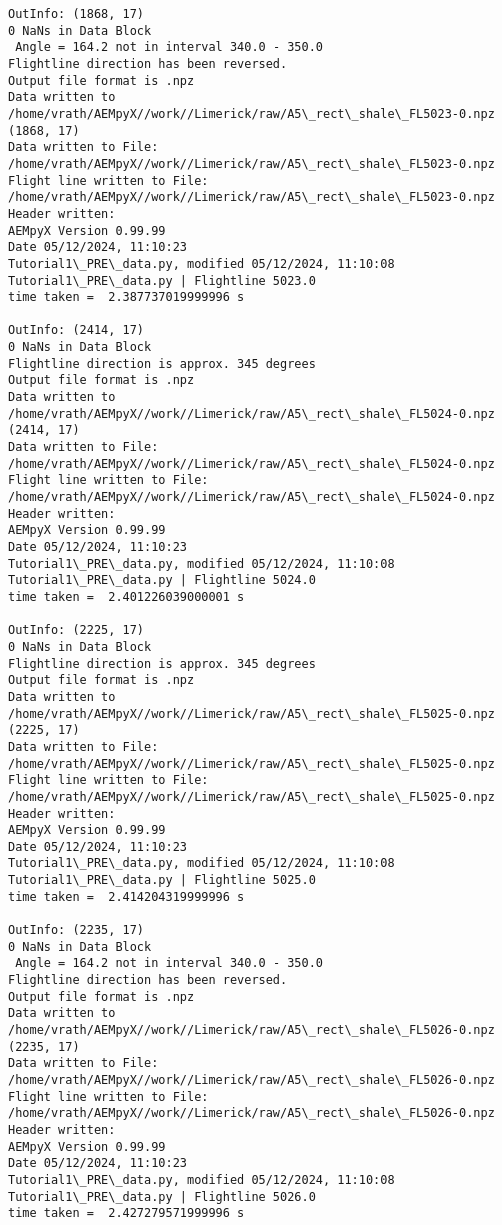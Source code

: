 \documentclass[11pt]{article}
\begin{document}
\begin{Verbatim}[commandchars=\\\{\}]
OutInfo: (1868, 17)
0 NaNs in Data Block
 Angle = 164.2 not in interval 340.0 - 350.0
Flightline direction has been reversed.
Output file format is .npz
Data written to
/home/vrath/AEMpyX//work//Limerick/raw/A5\_rect\_shale\_FL5023-0.npz
(1868, 17)
Data written to File:
/home/vrath/AEMpyX//work//Limerick/raw/A5\_rect\_shale\_FL5023-0.npz
Flight line written to File:
/home/vrath/AEMpyX//work//Limerick/raw/A5\_rect\_shale\_FL5023-0.npz
Header written:
AEMpyX Version 0.99.99
Date 05/12/2024, 11:10:23
Tutorial1\_PRE\_data.py, modified 05/12/2024, 11:10:08
Tutorial1\_PRE\_data.py | Flightline 5023.0
time taken =  2.387737019999996 s

OutInfo: (2414, 17)
0 NaNs in Data Block
Flightline direction is approx. 345 degrees
Output file format is .npz
Data written to
/home/vrath/AEMpyX//work//Limerick/raw/A5\_rect\_shale\_FL5024-0.npz
(2414, 17)
Data written to File:
/home/vrath/AEMpyX//work//Limerick/raw/A5\_rect\_shale\_FL5024-0.npz
Flight line written to File:
/home/vrath/AEMpyX//work//Limerick/raw/A5\_rect\_shale\_FL5024-0.npz
Header written:
AEMpyX Version 0.99.99
Date 05/12/2024, 11:10:23
Tutorial1\_PRE\_data.py, modified 05/12/2024, 11:10:08
Tutorial1\_PRE\_data.py | Flightline 5024.0
time taken =  2.401226039000001 s

OutInfo: (2225, 17)
0 NaNs in Data Block
Flightline direction is approx. 345 degrees
Output file format is .npz
Data written to
/home/vrath/AEMpyX//work//Limerick/raw/A5\_rect\_shale\_FL5025-0.npz
(2225, 17)
Data written to File:
/home/vrath/AEMpyX//work//Limerick/raw/A5\_rect\_shale\_FL5025-0.npz
Flight line written to File:
/home/vrath/AEMpyX//work//Limerick/raw/A5\_rect\_shale\_FL5025-0.npz
Header written:
AEMpyX Version 0.99.99
Date 05/12/2024, 11:10:23
Tutorial1\_PRE\_data.py, modified 05/12/2024, 11:10:08
Tutorial1\_PRE\_data.py | Flightline 5025.0
time taken =  2.414204319999996 s

OutInfo: (2235, 17)
0 NaNs in Data Block
 Angle = 164.2 not in interval 340.0 - 350.0
Flightline direction has been reversed.
Output file format is .npz
Data written to
/home/vrath/AEMpyX//work//Limerick/raw/A5\_rect\_shale\_FL5026-0.npz
(2235, 17)
Data written to File:
/home/vrath/AEMpyX//work//Limerick/raw/A5\_rect\_shale\_FL5026-0.npz
Flight line written to File:
/home/vrath/AEMpyX//work//Limerick/raw/A5\_rect\_shale\_FL5026-0.npz
Header written:
AEMpyX Version 0.99.99
Date 05/12/2024, 11:10:23
Tutorial1\_PRE\_data.py, modified 05/12/2024, 11:10:08
Tutorial1\_PRE\_data.py | Flightline 5026.0
time taken =  2.427279571999996 s


\end{Verbatim}
\end{document}
